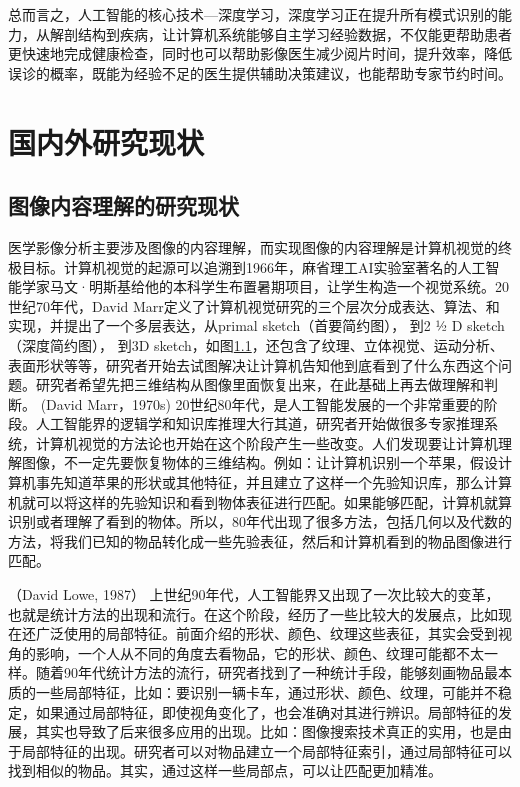 总而言之，人工智能的核心技术—深度学习，深度学习正在提升所有模式识别的能力，从解剖结构到疾病，让计算机系统能够自主学习经验数据，不仅能更帮助患者更快速地完成健康检查，同时也可以帮助影像医生减少阅片时间，提升效率，降低误诊的概率，既能为经验不足的医生提供辅助决策建议，也能帮助专家节约时间。       

\section{国内外研究现状}

\subsection{图像内容理解的研究现状}

医学影像分析主要涉及图像的内容理解，而实现图像的内容理解是计算机视觉的终极目标\cite{Cootes2004}。计算机视觉的起源可以追溯到1966年，麻省理工AI实验室著名的人工智能学家马文·明斯基给他的本科学生布置暑期项目，让学生构造一个视觉系统。20世纪70年代，David Marr定义了计算机视觉研究的三个层次分成表达、算法、和实现，并提出了一个多层表达，从primal sketch（首要简约图）， 到2 ½ D sketch（深度简约图）， 到3D sketch，如图\ref{}，还包含了纹理、立体视觉、运动分析、表面形状等等\cite{}，研究者开始去试图解决让计算机告知他到底看到了什么东西这个问题。研究者希望先把三维结构从图像里面恢复出来，在此基础上再去做理解和判断。
(David Marr，1970s)
20世纪80年代，是人工智能发展的一个非常重要的阶段。人工智能界的逻辑学和知识库推理大行其道，研究者开始做很多专家推理系统，计算机视觉的方法论也开始在这个阶段产生一些改变。人们发现要让计算机理解图像，不一定先要恢复物体的三维结构。例如：让计算机识别一个苹果，假设计算机事先知道苹果的形状或其他特征，并且建立了这样一个先验知识库，那么计算机就可以将这样的先验知识和看到物体表征进行匹配。如果能够匹配，计算机就算识别或者理解了看到的物体。所以，80年代出现了很多方法，包括几何以及代数的方法，将我们已知的物品转化成一些先验表征，然后和计算机看到的物品图像进行匹配。

（David Lowe, 1987）
上世纪90年代，人工智能界又出现了一次比较大的变革，也就是统计方法的出现和流行。在这个阶段，经历了一些比较大的发展点，比如现在还广泛使用的局部特征。前面介绍的形状、颜色、纹理这些表征，其实会受到视角的影响，一个人从不同的角度去看物品，它的形状、颜色、纹理可能都不太一样。随着90年代统计方法的流行，研究者找到了一种统计手段，能够刻画物品最本质的一些局部特征，比如：要识别一辆卡车，通过形状、颜色、纹理，可能并不稳定，如果通过局部特征，即使视角变化了，也会准确对其进行辨识。局部特征的发展，其实也导致了后来很多应用的出现。比如：图像搜索技术真正的实用，也是由于局部特征的出现。研究者可以对物品建立一个局部特征索引，通过局部特征可以找到相似的物品。其实，通过这样一些局部点，可以让匹配更加精准。


